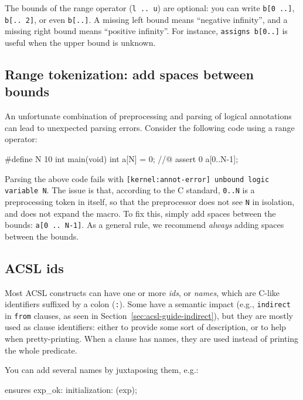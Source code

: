 \documentclass{frama-c-book}
\begin{document}
The bounds of the range operator (\texttt{l .. u}) are optional: you can write
\texttt{b[0 ..]}, \texttt{b[.. 2]}, or even \texttt{b[..]}. A missing left
bound means ``negative infinity'', and a missing right bound means
``positive infinity''. For instance, \texttt{assigns b[0..]} is useful when
the upper bound is unknown.

\subsection*{Range tokenization: add spaces between bounds}

An unfortunate combination of preprocessing and parsing of logical annotations
can lead to unexpected parsing errors. Consider the following code using
a range operator:

\begin{listing-nonumber}
#define N 10
int main(void) {
  int a[N] = {0};
  //@ assert 0 \in a[0..N-1];
}
\end{listing-nonumber}

Parsing the above code fails with
\texttt{[kernel:annot-error] unbound logic variable N}.
The issue is that, according to the C standard, \texttt{0..N} is a preprocessing token
in itself, so that the preprocessor does not see \texttt{N} in isolation, and does not expand
the macro. To fix this, simply add spaces between the bounds:
\texttt{a[0 .. N-1]}.
As a general rule, we recommend {\em always} adding spaces between the bounds.

\subsection*{ACSL ids}

Most ACSL constructs can have one or more {\em ids}, or {\em names}, which are
C-like identifiers suffixed by a colon (\texttt{:}).
Some have a semantic impact (e.g., \texttt{indirect} in \texttt{from} clauses,
as seen in Section~\ref{sec:acsl-guide-indirect}),
but they are mostly used as clause identifiers: either to
provide some sort of description, or to help when pretty-printing.
When a clause has names, they are used instead of printing the whole predicate.

You can add several names by juxtaposing them, e.g.:

\begin{listing-nonumber}
  ensures exp_ok: initialization: \initialized(exp);
\end{listing-nonumber}
\end{document}
